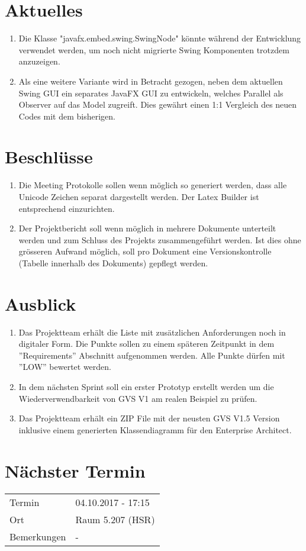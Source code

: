 \documentclass[11pt, a4paper,oneside]{scrartcl}
\begin{document}
\section{Aktuelles}
\begin{enumerate}
	\item Die Klasse "javafx.embed.swing.SwingNode" könnte während der Entwicklung verwendet werden, um noch nicht migrierte Swing Komponenten trotzdem anzuzeigen.
	\item Als eine weitere Variante wird in Betracht gezogen, neben dem aktuellen Swing GUI ein separates JavaFX GUI zu entwickeln, welches Parallel als Observer auf das Model zugreift. Dies gewährt einen 1:1 Vergleich des neuen Codes mit dem bisherigen.
\end{enumerate}

\section{Beschlüsse}
\begin{enumerate}
	\item Die Meeting Protokolle sollen wenn möglich so generiert werden, dass alle Unicode Zeichen separat dargestellt werden. Der Latex Builder ist entsprechend einzurichten. 
	\item Der Projektbericht soll wenn möglich in mehrere Dokumente unterteilt werden und zum Schluss des Projekts zusammengeführt werden. Ist dies ohne grösseren Aufwand möglich, soll pro Dokument eine Versionskontrolle (Tabelle innerhalb des Dokuments) gepflegt werden.
\end{enumerate}

\section{Ausblick}
\begin{enumerate}
	\item Das Projektteam erhält die Liste mit zusätzlichen Anforderungen noch in digitaler Form. Die Punkte sollen zu einem späteren Zeitpunkt in dem ''Requirements'' Abschnitt aufgenommen werden. Alle Punkte dürfen mit ''LOW'' bewertet werden. 
	\item In dem nächsten Sprint soll ein erster Prototyp erstellt werden um die Wiederverwendbarkeit von GVS V1 am realen Beispiel zu prüfen. 
	\item Das Projektteam erhält ein ZIP File mit der neusten GVS V1.5 Version inklusive einem generierten Klassendiagramm für den Enterprise Architect. 
\end{enumerate}

\section{Nächster Termin}
\begin{tabu} to \linewidth {l X }
	\toprule
	Termin & 04.10.2017 - 17:15 \\
	Ort & Raum 5.207 (HSR) \\
	Bemerkungen & - \\
	\bottomrule
\end{tabu}
\end{document}
